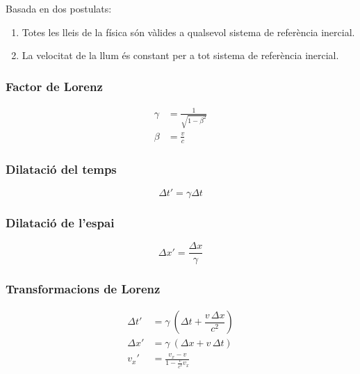 Basada en dos postulats:

\begin{enumerate}
    \item Totes les lleis de la física són vàlides a qualsevol sistema de
        referència inercial.
    \item La velocitat de la llum és constant per a tot sistema de referència
        inercial.
\end{enumerate}

\subsubsection{Factor de Lorenz}
\label{ssub:factor_de_lorenz}

\begin{align}
    \gamma &= \frac{1}{\sqrt{1 - \beta^2}} \\
    \beta &= \frac{v}{c}
\end{align}

\subsubsection{Dilatació del temps}
\label{ssub:dilatacio_del_temps}

\begin{equation}
    \Delta t' = \gamma  \Delta t
\end{equation}

\subsubsection{Dilatació de l'espai}
\label{ssub:dilatacio_de_l_espai}

\begin{equation}
    \Delta x' = \frac{\Delta x}{\gamma}
\end{equation}

\subsubsection{Transformacions de Lorenz}
\label{ssub:transformacions_de_lorenz}

\begin{align}
    \Delta t' &= \gamma \ \left(\Delta t + \dfrac{v \,\Delta x}{c^{2}} \right) \\
    \Delta x' &= \gamma \ (\Delta x + v \,\Delta t) \\
    v_x' &= \frac{v_x-v}{1-\frac{v}{c^2}v_x}
\end{align}


